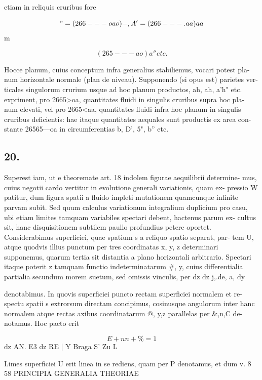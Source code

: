 \documentclass[12pt,a4paper]{article}
\begin{document}
etiam in reliquis cruribus fore

\[     "= (266---oao)-,          A'= (266---.aa) aa\]
m

\[                                                                    (265 --- ao)a'' etc.\]

Hocce planum, cuius conceptum infra generalius stabiliemus, vocari potest pla-
num horizontale normale (plan de niveau). Supponendo (si opus est) parietes ver-
ticales singulorum crurium usque       ad hoc planum        productos,    ah, ah, a'h" etc.
expriment, pro 2665>oa, quantitates fluidi in singulis cruribus supra hoc pla-
num elevati, vel pro 2665<aa, quantitates fluidi infra hoc planum in singulis
cruribus deficientis: hae itaque quantitates aequales sunt productis ex area con-
stante   26565---oa   in circumferentias     b, D', 5", b'' etc.


\subsection*{20.}

Superest iam, ut e theoremate art. 18 indolem figurae aequilibrii determine-
mus, cuius negotii cardo vertitur in evolutione generali variationis, quam ex-
pressio W patitur, dum figura spatii a fluido impleti mutationem quamcunque
infinite parvam subit. Sed quum calculus variationum integralium duplicium pro
casu, ubi etiam limites tamquam variabiles spectari debent, hactenus parum ex-
cultus sit, hanc disquisitionem subtilem paullo profundius petere oportet.
Considerabimus superficiei, quae spatium s a reliquo spatio separat, par-
tem U, atque quodvis illius punctum per tres coordinatas x, y, z determinari
supponemus, quarum tertia sit distantia a plano horizontali arbitrario.    Spectari
itaque poterit z tamquam functio indeterminatarum \#, y, cuius differentialia
partialia secundum morem suetum, sed omissis vinculis, per
dz             dz
j,.de,         a, dy



denotabimus.    In quovis superficiei puncto rectam superficiei normalem et re-
spectu spatii s extrorsum directam concipimus, cosinusque angulorum inter hanc
normalem atque rectas axibus coordinatarum             @, y,z    parallelas per   \&,n,C   de-
notamus.    Hoc pacto erit

\[                                  E+nn+\%              = 1\]
dz AN. E3           dz
RE          |
Y Braga S'          Zu         L

Limes superficiei U erit linea in se rediens, quam per P denotamus, et dum
v.                                                         8
58                          PRINCIPIA   GENERALIA    THEORIAE
\end{document}
